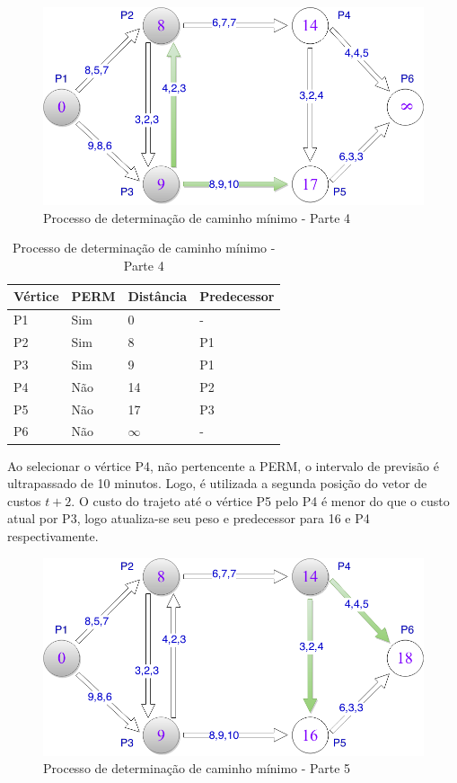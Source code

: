 \begin{figure}[htbp]
\centering
 \includegraphics[width=.50\textwidth]{figuras/leo5.png}
\caption{Processo de determinação de caminho mínimo - Parte 4}
\label{fig:leo5}
\end{figure}

\begin{table}[htbp]
  \centering
  \begin{tabular}{l l l l}
  \toprule
  Vértice & PERM & Distância & Predecessor\\
  \midrule
  P1 & Sim & 0 & - \\
  P2 & Sim & 8 & P1 \\
  P3 & Sim & 9 & P1 \\
  P4 & Não & 14 & P2 \\
  P5 & Não & 17 & P3 \\
  P6 & Não & $\infty$ & - \\
  \bottomrule
  \end{tabular}
\caption{Processo de determinação de caminho mínimo - Parte 4}
 \label{tab:leotab4}
\end{table}
\FloatBarrier

Ao selecionar o vértice P4, não pertencente a PERM, o intervalo de previsão é ultrapassado
de 10 minutos. Logo, é utilizada a segunda posição do vetor de custos $t + 2$. O custo do trajeto até
o vértice P5 pelo P4 é menor do que o custo atual por P3, logo atualiza-se seu peso e predecessor
para 16 e P4 respectivamente.
\FloatBarrier
\begin{figure}[htbp]
\centering
 \includegraphics[width=.50\textwidth]{figuras/leo6.png}
\caption{Processo de determinação de caminho mínimo - Parte 5}
\label{fig:leo6}
\end{figure}

